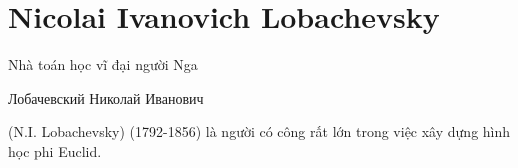 \chapter{Nicolai Ivanovich Lobachevsky}

Nhà toán học vĩ đại người Nga 
\begin{otherlanguage}{russian}
    Лобачевский Николай Иванович   
\end{otherlanguage}
(N.I. Lobachevsky) (1792-1856) là người có công rất lớn trong việc xây dựng hình học phi Euclid.

